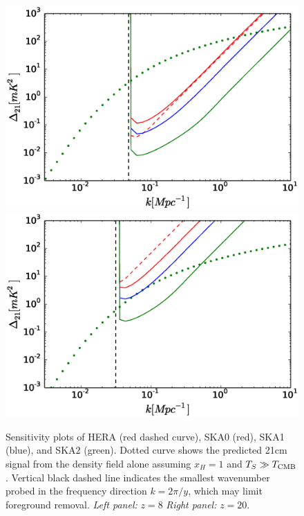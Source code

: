 \documentclass{PoS}
\begin{document}
\begin{figure}[htbp]
\begin{center}
\includegraphics[scale=0.35]{figures/sensitivityPlot_z8.eps}
\includegraphics[scale=0.35]{figures/sensitivityPlot_z20.eps}
\caption{Sensitivity plots of HERA (red dashed curve), SKA0 (red), SKA1 (blue), and SKA2 (green). Dotted curve shows the predicted 21cm signal from the density field alone assuming $x_H=1$ and $T_S\gg T_{\rm CMB}$. Vertical black dashed line indicates the smallest wavenumber probed in the frequency direction $k=2\pi/y$, which may limit foreground removal.  {\em Left panel:} $z=8$ {\em Right panel:} $z=20$.}
\label{fig:sensitivity}
\end{center}
\end{figure}
\end{document}
